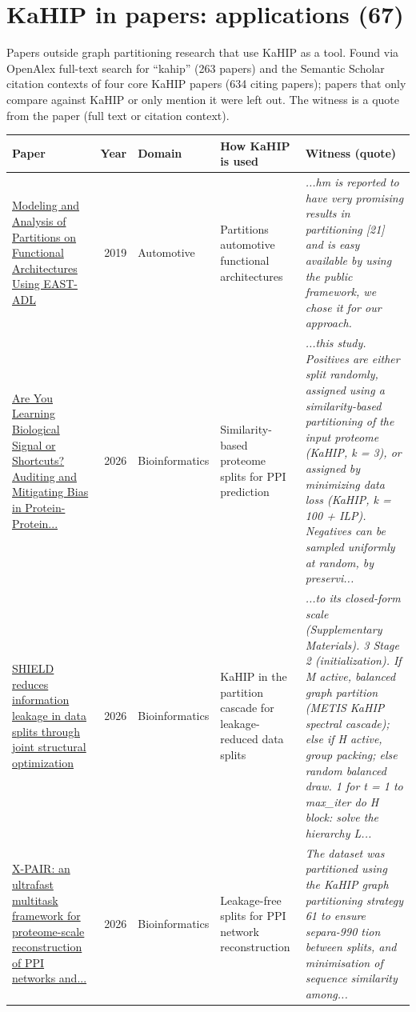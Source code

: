 \documentclass[9pt]{extarticle}
\begin{document}
\section*{KaHIP in papers: applications (67)}
Papers outside graph partitioning research that use KaHIP as a tool. Found via OpenAlex full-text search for ``kahip'' (263 papers) and the Semantic Scholar citation contexts of four core KaHIP papers (634 citing papers); papers that only compare against KaHIP or only mention it were left out. The witness is a quote from the paper (full text or citation context).
\begin{longtable}{@{}>{\raggedright}p{6.6cm}r>{\raggedright}p{2.9cm}>{\raggedright}p{4.6cm}>{\raggedright\arraybackslash}p{8.4cm}@{}}\toprule
\textbf{Paper} & \textbf{Year} & \textbf{Domain} & \textbf{How KaHIP is used} & \textbf{Witness (quote)}\\\midrule\endhead
\href{https://doi.org/10.1007/978-3-030-37873-8_13}{Modeling and Analysis of Partitions on Functional Architectures Using EAST-ADL} & 2019 & Automotive & Partitions automotive functional architectures & {\footnotesize\itshape ...hm is reported to have very promising results in partitioning [21] and is easy available by using the public framework, we chose it for our approach.}\\
\href{https://doi.org/10.48550/arxiv.2609.10193}{Are You Learning Biological Signal or Shortcuts? Auditing and Mitigating Bias in Protein-Protein...} & 2026 & Bioinformatics & Similarity-based proteome splits for PPI prediction & {\footnotesize\itshape ...this study. Positives are either split randomly, assigned using a similarity-based partitioning of the input proteome (KaHIP, k = 3), or assigned by minimizing data loss (KaHIP, k = 100 + ILP). Negatives can be sampled uniformly at random, by preservi...}\\
\href{https://doi.org/10.21203/rs.3.rs-11005002/v1}{SHIELD reduces information leakage in data splits through joint structural optimization} & 2026 & Bioinformatics & KaHIP in the partition cascade for leakage-reduced data splits & {\footnotesize\itshape ...to its closed-form scale (Supplementary Materials). 3 Stage 2 (initialization). If M active, balanced graph partition (METIS  KaHIP  spectral cascade); else if H active, group packing; else random balanced draw. 1 for t = 1 to max\_iter do H block: solve the hierarchy L...}\\
\href{https://doi.org/10.64898/2026.07.20.739596}{X-PAIR: an ultrafast multitask framework for proteome-scale reconstruction of PPI networks and...} & 2026 & Bioinformatics & Leakage-free splits for PPI network reconstruction & {\footnotesize\itshape The dataset was partitioned using the KaHIP graph partitioning strategy 61 to ensure separa-990 tion between splits, and minimisation of sequence similarity among...}\\

\end{longtable}
\end{document}

